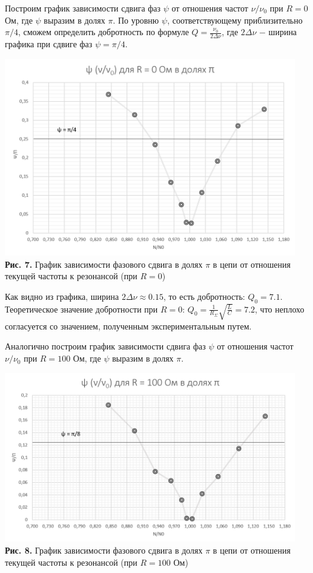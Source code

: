 \documentclass[a4paper,12pt]{article} %
\begin{document}
\hfill \break Построим график зависимости сдвига фаз $\psi$ от отношения частот $\nu/\nu_{0}$ при $R = 0$ Ом, где $\psi$ выразим в долях $\pi$. По уровню $\psi$, соответствующему приблизительно $\pi/4$, сможем определить добротность по формуле $Q = \frac{\nu_{0}}{2\Delta\nu}$, где $2\Delta\nu$ $-$ ширина графика при сдвиге фаз $\psi = \pi/4$.

\begin{center}
\includegraphics[width=0.95\textwidth]{3.2.1_7.png}\\
\textbf{Рис. 7.} График зависимости фазового сдвига в долях $\pi$ в цепи от отношения текущей частоты к резонансой (при $R = 0$) \\
\end{center}

\hfill \break Как видно из графика, ширина $2\Delta\nu \approx 0.15$, то есть добротность: $Q_{0} = 7.1$. Теоретическое значение добротности при $R = 0$: $Q_{0} = \frac{1}{R_{\Sigma}} \sqrt{\frac{L}{C}} = 7.2$, что неплохо согласуется со значением, полученным экспериментальным путем.

\hfill \break Аналогично построим график зависимости сдвига фаз $\psi$ от отношения частот $\nu/\nu_{0}$ при $R = 100$ Ом, где $\psi$ выразим в долях $\pi$.

\begin{center}
\includegraphics[width=0.95\textwidth]{3.2.1_8.png}\\
\textbf{Рис. 8.} График зависимости фазового сдвига в долях $\pi$ в цепи от отношения текущей частоты к резонансой (при $R = 100$ Ом) \\
\end{center}
\end{document}
